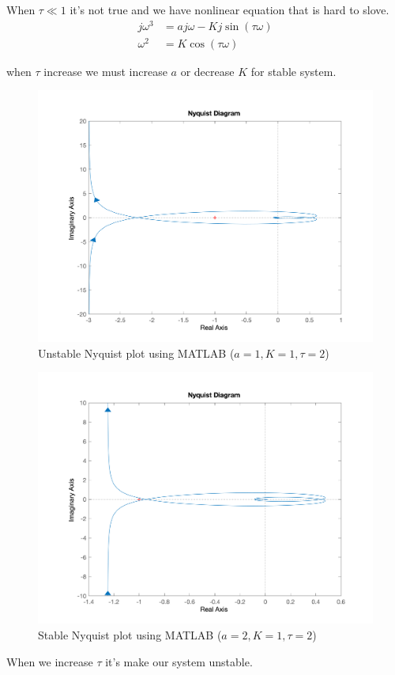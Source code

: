 When $\tau \ll 1$ it's not true and we have nonlinear equation that is hard to slove.
\begin{align*}
	j\omega^3 &=aj\omega - Kj\sin(\tau\omega)\\
	\omega^2 &=K\cos(\tau\omega)
\end{align*}

when $\tau$ increase we must increase $a$ or decrease $K$ for stable system.

\begin{figure}[H]
	\caption{Unstable Nyquist plot using MATLAB ($a = 1, K = 1, \tau = 2$)}
	\centering
	\includegraphics[width=12cm]{../Figure/Q3/MATLAB-Nyquist_increase_tau.png}
\end{figure}

\begin{figure}[H]
	\caption{Stable Nyquist plot using MATLAB ($a = 2, K = 1, \tau = 2$)}
	\centering
	\includegraphics[width=12cm]{../Figure/Q3/MATLAB-Nyquist_increase_tau_and_a.png}
\end{figure}
When we increase $\tau$ it's make our system unstable.

